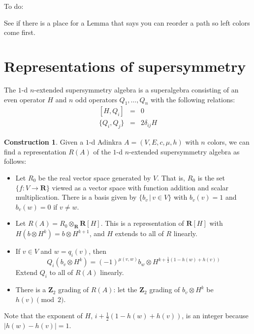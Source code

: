\documentclass[12pt,twoside,singlespace]{article}
\numberwithin{equation}{section}
\theoremstyle{definition}
\newtheorem{construction}[equation]{Construction}
\newcommand{\ZZ}{\mathbf{Z}}
\newcommand{\RR}{\mathbf{R}}
\begin{document}
To do:

See if there is a place for a Lemma that says you can reorder a path so left colors come first.

\newpage

\appendix




\section{Representations of supersymmetry}
The $1$-d $n$-extended supersymmetry algebra is a superalgebra consisting of an even operator $H$ and $n$ odd operators $Q_1, \ldots, Q_n$ with the following relations:
\begin{eqnarray}
\label{eqn:susy1d1}
[H,Q_i]&=&0\\
\label{eqn:susy1d2}
\{Q_i,Q_j\}&=&2\delta_{ij}H
\end{eqnarray}

\begin{construction}
\label{cons:susy1d}
Given a $1$-d Adinkra $A=(V,E,c,\mu,h)$ with $n$ colors, we can find a representation $R(A)$ of the $1$-d $n$-extended supersymmetry algebra as follows:
\begin{itemize}
\item Let $R_0$ be the real vector space generated by $V$.  That is, $R_0$ is the set $\{f:V\to \RR\}$ viewed as a vector space with function addition and scalar multiplication.  There is a basis given by $\{b_v\,|\,v\in V\}$ with $b_v(v)=1$ and $b_v(w)=0$ if $v\not=w$.
\item Let $R(A)=R_0\otimes_\RR \RR[H]$.  This is a representation of $\RR[H]$ with $H(b\otimes H^k)=b\otimes H^{k+1}$, and $H$ extends to all of $R$ linearly.
\item If $v\in V$ and $w=q_i(v)$, then
\[Q_i(b_v\otimes H^k)=(-1)^{\mu(v,w)} b_w\otimes H^{k+\frac12(1-h(w)+h(v))}\]
Extend $Q_i$ to all of $R(A)$ linearly.
\item There is a $\ZZ_2$ grading of $R(A)$: let the $\ZZ_2$ grading of $b_v\otimes H^k$ be $h(v)\pmod{2}$.
\end{itemize}
\end{construction}
Note that the exponent of $H$, $i+\frac12(1-h(w)+h(v))$, is an integer because $|h(w)-h(v)|=1$.
\end{document}
